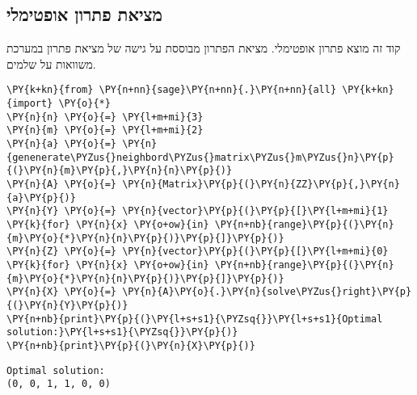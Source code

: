 \newpage
    \hypertarget{optimal-solution}{%
\subsection{מציאת פתרון אופטימלי}\label{optimal-solution}}
קוד זה מוצא 
פתרון אופטימלי.
מציאת הפתרון מבוססת על גישה של מציאת פתרון במערכת משוואות על שלמים.
\begin{english}
    \begin{tcolorbox}[breakable, size=fbox, boxrule=1pt, pad at break*=1mm,colback=cellbackground, colframe=cellborder]
\begin{Verbatim}[commandchars=\\\{\}]
\PY{k+kn}{from} \PY{n+nn}{sage}\PY{n+nn}{.}\PY{n+nn}{all} \PY{k+kn}{import} \PY{o}{*}
\PY{n}{n} \PY{o}{=} \PY{l+m+mi}{3}
\PY{n}{m} \PY{o}{=} \PY{l+m+mi}{2}
\PY{n}{a} \PY{o}{=} \PY{n}{genenerate\PYZus{}neighbord\PYZus{}matrix\PYZus{}m\PYZus{}n}\PY{p}{(}\PY{n}{m}\PY{p}{,}\PY{n}{n}\PY{p}{)}
\PY{n}{A} \PY{o}{=} \PY{n}{Matrix}\PY{p}{(}\PY{n}{ZZ}\PY{p}{,}\PY{n}{a}\PY{p}{)}
\PY{n}{Y} \PY{o}{=} \PY{n}{vector}\PY{p}{(}\PY{p}{[}\PY{l+m+mi}{1} \PY{k}{for} \PY{n}{x} \PY{o+ow}{in} \PY{n+nb}{range}\PY{p}{(}\PY{n}{m}\PY{o}{*}\PY{n}{n}\PY{p}{)}\PY{p}{]}\PY{p}{)}
\PY{n}{Z} \PY{o}{=} \PY{n}{vector}\PY{p}{(}\PY{p}{[}\PY{l+m+mi}{0} \PY{k}{for} \PY{n}{x} \PY{o+ow}{in} \PY{n+nb}{range}\PY{p}{(}\PY{n}{m}\PY{o}{*}\PY{n}{n}\PY{p}{)}\PY{p}{]}\PY{p}{)}
\PY{n}{X} \PY{o}{=} \PY{n}{A}\PY{o}{.}\PY{n}{solve\PYZus{}right}\PY{p}{(}\PY{n}{Y}\PY{p}{)}
\PY{n+nb}{print}\PY{p}{(}\PY{l+s+s1}{\PYZsq{}}\PY{l+s+s1}{Optimal solution:}\PY{l+s+s1}{\PYZsq{}}\PY{p}{)}
\PY{n+nb}{print}\PY{p}{(}\PY{n}{X}\PY{p}{)}
\end{Verbatim}
\end{tcolorbox}

    \begin{Verbatim}[commandchars=\\\{\}]
Optimal solution:
(0, 0, 1, 1, 0, 0)
    \end{Verbatim}
\end{english}

